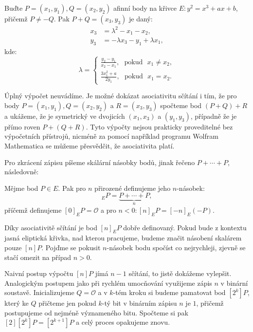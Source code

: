 \documentclass[12pt]{report}
\begin{document}
\begin{veta}\label{sum}
Buďte $P = (x_1,y_1), Q = (x_2,y_2)$ afinní body na křivce $E : y^2 = x^3+ax+b$, přičemž $P \neq -Q$. Pak $P+Q = (x_3,y_3)$ je daný:
\begin{align*}
x_3 &= \lambda^2 - x_1 - x_2,\\
y_3 &= - \lambda x_3 - y_1 + \lambda x_1,
\end{align*}
kde:
\begin{equation*}
\lambda = \begin{cases}
\frac{y_2 - y_1}{x_2-x_1}, \text{ } \mathrm{ pokud } \text{ } x_1 \neq x_2,\\
\frac{3x_1 ^2 + a}{2y_1}, \text{ } \mathrm{ pokud } \text{ }  x_1 = x_2.
\end{cases}
\end{equation*}

\end{veta}
Úplný výpočet neuvádíme. Je možné dokázat asociativitu sčítání i tím, že pro body $P = (x_1,y_1), Q = (x_2,y_2)$ a $R = (x_3,y_3)$ spočteme bod $(P+Q)+R$ a ukážeme, že je symetrický ve dvojicích $(x_1,x_3)$ a $(y_1,y_3)$, případně že je přímo roven $P+(Q+R)$. Tyto výpočty nejsou prakticky proveditelné bez výpočetních přístrojů, nicméně za pomocí například programu Wolfram Mathematica se můžeme přesvědčit, že asociativita platí.

Pro zkrácení zápisu píšeme skálární násobky bodů, jinak řečeno $P+\cdots+P$, následovně:

\begin{definice}
Mějme bod $P \in E$. Pak pro $n$ přirozené definujeme jeho $n$-násobek:
\begin{equation*}
[n]_E P = \underbrace{P+ \cdots + P}_{n},
\end{equation*}
příčemž definujeme $[0]_E P = \mathcal{O}$ a pro $n < 0: [n]_E P = [-n]_E (-P)$.
\end{definice}

Díky asociativitě sčítání je bod $[n]_EP$ dobře definovaný. Pokud bude z kontextu jasná eliptická křivka, nad kterou pracujeme, budeme značit násobení skalárem pouze $[n]P$. Pojďme se pokusit $n$-násobek bodu spočíst co nejrychleji, zjevně se stačí omezit na případ $n > 0$.

Naivní postup výpočtu $[n] P$ jímá $n-1$ sčítání, to jistě dokážeme vylepšit. Analogickým postupem jako při rychlém umocňování využijeme zápis $n$ v binární soustavě. Inicializujeme $Q = \mathcal{O}$ a v $k$-tém kroku si budeme pamatovat bod $[2^k] P$, který ke $Q$ přičteme jen pokud $k$-tý bit v binárním zápisu $n$ je $1$, přičemž postupujeme od nejméně význameného bitu. Spočteme si pak $[2][2^k] P = [2^{k+1}] P$ a celý proces opakujeme znovu.
\end{document}

